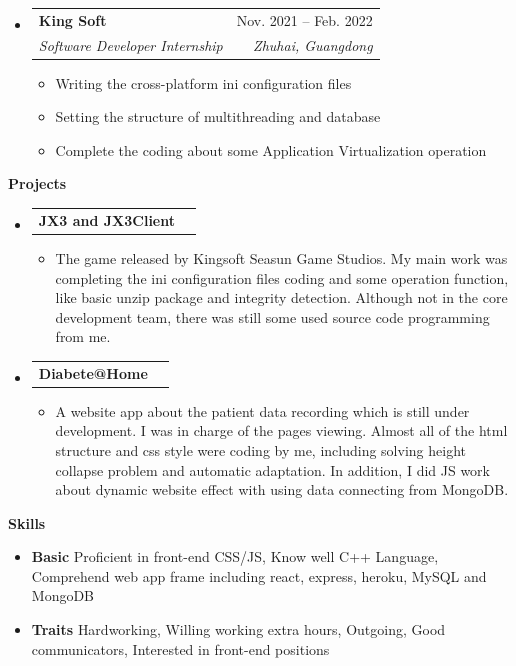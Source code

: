 \documentclass[letterpaper,12pt]{article}[leftmargin=*]
\makeatletter
\def \entryspacing {-0pt}
\renewcommand{\section}[2]{\vspace{5pt}
  \colorbox{secondary}{\color{white}\raggedbottom\normalsize\textbf{{#1}{\hspace{7pt}#2}}}
}
\newcommand{\resumeEntryStart}{\begin{itemize}[leftmargin=2.5mm]}
\newcommand{\resumeEntryEnd}{\end{itemize}\vspace{\entryspacing}}
\newcommand{\resumeItemListStart}{\begin{itemize}[leftmargin=4.5mm]}
\newcommand{\resumeItemListEnd}{\end{itemize}}
\newcommand{\resumeItem}[1]{
  \item\small{
    {#1 \vspace{-2pt}}
  }
}
\newcommand{\resumeEntryTSDL}[4]{
  \vspace{-1pt}\item[]
    \begin{tabularx}{0.97\textwidth}{X@{\hspace{60pt}}r}
      \textbf{\color{primary}#1} & {\firabook\color{accent}\small#2} \\
      \textit{\color{accent}\small#3} & \textit{\color{accent}\small#4} \\
    \end{tabularx}\vspace{-6pt}
}
\newcommand{\resumeEntryTD}[2]{
  \vspace{-1pt}\item[]
    \begin{tabularx}{0.97\textwidth}{X@{\hspace{60pt}}r}
      \textbf{\color{primary}#1} & {\firabook\color{accent}\small#2} \\
    \end{tabularx}\vspace{-6pt}
}
\newcommand{\resumeEntryS}[2]{
  \item[]\small{
    \textbf{\color{primary}#1 }{ #2 \vspace{-6pt}}
  }
}
\makeatother
\begin{document}
  \resumeEntryStart
    \resumeEntryTSDL
      {King Soft}{Nov. 2021 -- Feb. 2022}
      {Software Developer Internship}{Zhuhai, Guangdong}
    \resumeItemListStart
      \resumeItem {Writing the cross-platform ini configuration files}
      \resumeItem {Setting the structure of multithreading and database}
      \resumeItem {Complete the coding about some Application Virtualization operation}
    \resumeItemListEnd
  \resumeEntryEnd
  
\section{\faFlask}{Projects}

  \resumeEntryStart
    \resumeEntryTD
      {JX3 and JX3Client}{}
    \resumeItemListStart
      \resumeItem {The game released by Kingsoft Seasun Game Studios. My main work was completing the ini configuration files coding and some operation function, like basic unzip package and integrity detection. Although not in the core development team, there was still some used source code programming from me.}
    \resumeItemListEnd
  \resumeEntryEnd

  \resumeEntryStart
    \resumeEntryTD
      {Diabete@Home}{}
    \resumeItemListStart
      \resumeItem {A website app about the patient data recording which is still under development. I was in charge of the pages viewing. Almost all of the html structure and css style were coding by me, including solving height collapse problem and automatic adaptation. In addition, I did JS work about dynamic website effect with using data connecting from MongoDB.}
    \resumeItemListEnd
  \resumeEntryEnd
  
\section{\faGears}{Skills}
 \resumeEntryStart
  \resumeEntryS{Basic } {Proficient in front-end CSS/JS, Know well C++ Language, Comprehend web app frame including react, express, heroku, MySQL and MongoDB}
  \resumeEntryS{Traits } {Hardworking, Willing working extra hours, Outgoing, Good communicators, Interested in front-end positions}
 \resumeEntryEnd
\end{document}
